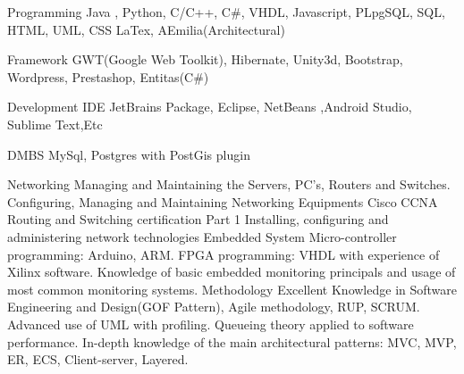 


\begin{cvskills}


\cvskill
{Programming} %
{Java , Python, C/C++, C\#, VHDL, Javascript, PLpgSQL, SQL, HTML, UML, CSS LaTex, AEmilia(Architectural)  } %

\hline

\cvskill
{Framework} %
{GWT(Google Web Toolkit), Hibernate, Unity3d, Bootstrap, Wordpress, Prestashop, Entitas(C\#) } %

\hline

\cvskill
{Development IDE} %
{JetBrains Package, Eclipse, NetBeans ,Android Studio, Sublime Text,Etc} %

\hline


\cvskill
{DMBS} %
{MySql, Postgres with PostGis plugin} %

\hline

\cvskill
{Networking} %
{Managing and Maintaining the Servers, PC's, Routers and Switches.
	Configuring, Managing and Maintaining \newline Networking Equipments
	Cisco CCNA Routing and Switching certification Part 1
	Installing, configuring and \newline administering network technologies 
} %
\hline
\cvskill
{Embedded System} %
{Micro-controller programming: Arduino, ARM. 
 FPGA programming: VHDL with experience of Xilinx software. \newline
 Knowledge of basic embedded monitoring principals and usage of most common monitoring systems. 
} %
\hline
\cvskill
{Methodology} %
{Excellent Knowledge in Software Engineering and Design(GOF Pattern), Agile methodology, RUP, SCRUM. 
\newline Advanced use of UML with profiling. Queueing theory applied to software performance. 
\newline In-depth knowledge of the main architectural patterns: MVC, MVP, ER, ECS, Client-server, Layered.
} %


\end{cvskills}
